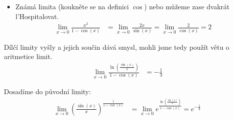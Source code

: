 \begin{enumerate}
{\begin{itemize}
				\item  Známá limita (koukněte se na definici $\cos$) nebo můžeme zase dvakrát l'Hospitalovat.
					\begin{align*}
						\lim_{x \rightarrow 0} \frac{x^2}{1-\cos(x)} &= \lim_{x \rightarrow 0} \frac{2x}{\sin(x)} = \lim_{x \rightarrow 0} \frac{2}{\cos(x)} = 2
					\end{align*}

			\end{itemize}
			Dílčí limity vyšly a jejich součin dává smysl, mohli jsme tedy použít větu o aritmetice limit.
			\begin{align*}
				\lim_{x \rightarrow 0} \frac{\ln\left( \frac{\sin(x)}{x} \right)}{1-\cos(x)} &= - \frac{1}{3}
			\end{align*}

			Dosadíme do původní limity:
			\begin{align*}
				\lim_{x \rightarrow 0} \left( \frac{\sin(x)}{x} \right)^{\frac{1}{1-\cos(x)}} &= \lim_{x \rightarrow 0} e^{\frac{\ln\left( \frac{\sin(x)}{x} \right)}{1-\cos(x)}} = e^{-\frac{1}{3}}
			\end{align*}
		}

\end{enumerate}

